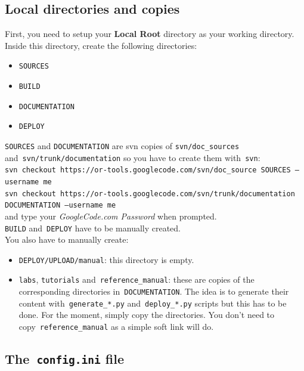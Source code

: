 \documentclass[a4paper,10pt]{article}
\newcommand{\code}[1]{\texttt{#1}}
\begin{document}
\subsection{Local directories and copies}

First, you need to setup your {\bf Local Root} directory as your working directory. Inside this directory, create the following directories:
\begin{itemize}
\item \code{SOURCES}
\item \code{BUILD}
\item \code{DOCUMENTATION}
\item \code{DEPLOY}
\end{itemize}

\code{SOURCES} and \code{DOCUMENTATION} are svn copies of \code{svn/doc\_sources} and~\code{svn/trunk/documentation} so you have to create them with~\code{svn}:\\

\code{svn checkout https://or-tools.googlecode.com/svn/doc\_source SOURCES --username me}\\

\code{svn checkout https://or-tools.googlecode.com/svn/trunk/documentation DOCUMENTATION --username me}\\

and type your \emph{GoogleCode.com Password} when prompted.\\

\code{BUILD} and~\code{DEPLOY} have to be manually created.\\

You also have to manually create:

\begin{itemize}
\item \code{DEPLOY/UPLOAD/manual}: this directory is empty.
\item \code{labs}, \code{tutorials} and~\code{reference\_manual}: these are copies of the corresponding directories in~\code{DOCUMENTATION}. The idea is to generate their content with~\code{generate\_*.py} and~\code{deploy\_*.py} scripts but this has to be done. For the moment, simply copy the directories. You don't need to copy~\code{reference\_manual} as a simple soft link will do.
\end{itemize}

\subsection{The~\code{config.ini} file}
\end{document}
